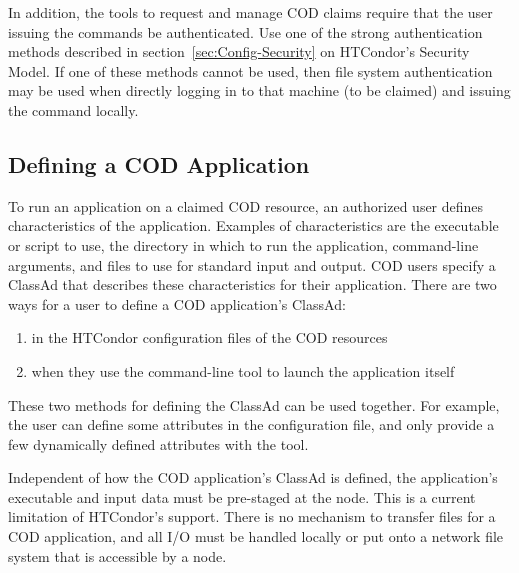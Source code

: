 In addition, the tools to request and manage COD claims
require that the user issuing the commands be authenticated. 
Use one of the strong authentication methods described
in section~\ref{sec:Config-Security} on HTCondor's Security Model.
If one of these methods cannot be used,
then file system authentication may be used
when directly logging in to that machine (to be claimed)
and issuing the command locally.


\subsection{\label{sec:cod-setup}
Defining a COD Application}

To run an application on a claimed COD resource,
an authorized user defines 
characteristics of the application.
Examples of characteristics are the executable or script to use,
the directory in which to run the application,
command-line arguments, and
files to use for standard input and output.
COD users specify a ClassAd that describes these characteristics
for their application.  
There are two ways for a user to define a COD application's ClassAd:

\begin{enumerate}
\item in the HTCondor configuration files of the COD resources
\item when they use the  command-line tool to launch the
application itself
\end{enumerate}

These two methods for defining the ClassAd can be used together.
For example, the user can define some attributes
in the configuration file, and only provide a few dynamically defined
attributes with the  tool.

Independent of how the COD application's ClassAd is defined,
the application's executable and input
data must be pre-staged at the node.
This is a current limitation of HTCondor's support.
There is no mechanism to transfer files for a COD application, 
and all I/O must be handled locally or put onto a network
file system that is accessible by a node.

